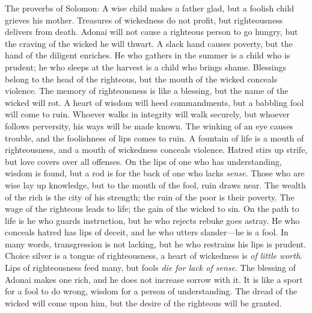 \begin{biblechapter} %
 The proverbs of Solomon: 
A wise child makes a father glad, 
but a foolish child grieves his mother.
\verse Treasures of wickedness do not profit, 
but righteousness delivers from death.
\verse Adonai will not cause a righteous person to go hungry, 
but the craving of the wicked he will thwart.
\verse A slack hand causes poverty, 
but the hand of the diligent enriches.
\verse He who gathers in the summer is a child who is prudent; 
he who sleeps at the harvest is a child who brings shame.
\verse Blessings belong to the head of the righteous, 
but the mouth of the wicked conceals violence.
\verse The memory of righteousness is like a blessing, 
but the name of the wicked will rot.
\verse A heart of wisdom will heed commandments, 
but a babbling fool will come to ruin.
\verse Whoever walks in integrity will walk securely, 
but whoever follows perversity, his ways will be made known.
\verse The winking of an eye causes trouble, 
and the foolishness of lips comes to ruin.
\verse A fountain of life is a mouth of righteousness, 
and a mouth of wickedness conceals violence.
\verse Hatred stirs up strife, 
but love covers over all offenses.
\verse On the lips of one who has understanding, wisdom is found, 
but a rod is for the back of one who lacks \textit{sense}.
\verse Those who are wise lay up knowledge, 
but to the mouth of the fool, ruin draws near.
\verse The wealth of the rich is the city of his strength; 
the ruin of the poor is their poverty.
\verse The wage of the righteous leads to life; 
the gain of the wicked to sin.
\verse On the path to life is he who guards instruction, 
but he who rejects rebuke goes astray.
\verse He who conceals hatred has lips of deceit, 
and he who utters slander—he is a fool.
\verse In many words, transgression is not lacking, 
but he who restrains his lips is prudent.
\verse Choice silver is a tongue of righteousness, 
a heart of wickedness is \textit{of little worth}.
\verse Lips of righteousness feed many, 
but fools \textit{die for lack of sense}.
\verse The blessing of Adonai makes one rich, 
and he does not increase sorrow with it.
\verse It is like a sport for a fool to do wrong, 
wisdom for a person of understanding.
\verse The dread of the wicked will come upon him, 
but the desire of the righteous will be granted.

\end{biblechapter}
